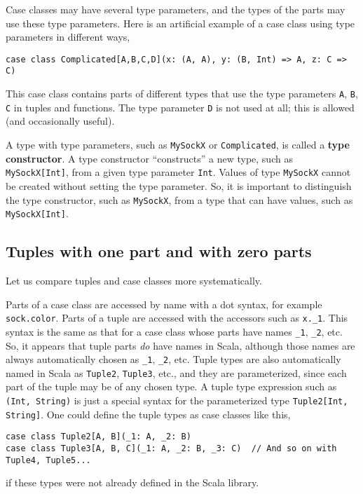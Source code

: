 Case classes may have several type parameters, and the types of the
parts may use these type parameters. Here is an artificial example
of a case class using type parameters in different ways,
\begin{lstlisting}
case class Complicated[A,B,C,D](x: (A, A), y: (B, Int) => A, z: C => C)
\end{lstlisting}
This case class contains parts of different types that use the type
parameters \lstinline!A!, \lstinline!B!, \lstinline!C! in tuples
and functions. The type parameter \lstinline!D! is not used at all;
this is allowed (and occasionally useful).

A type with type parameters, such as \lstinline!MySockX! or \lstinline!Complicated!,
is called a \textbf{type constructor}. A
type constructor ``constructs'' a new type, such as \lstinline!MySockX[Int]!,
from a given type parameter \lstinline!Int!. Values of type \lstinline!MySockX!
cannot be created without setting the type parameter. So, it is important
to distinguish the type constructor, such as \lstinline!MySockX!,
from a type that can have values, such as \lstinline!MySockX[Int]!.

\subsection{Tuples with one part and with zero parts}

Let us compare tuples and case classes more systematically.

Parts of a case class are accessed by name with a dot syntax, for
example \lstinline!sock.color!. Parts of a tuple are accessed with
the accessors such as \lstinline!x._1!. This syntax is the same as
that for a case class whose parts have names \lstinline!_1!, \lstinline!_2!,
etc. So, it appears that tuple parts \emph{do} have names in Scala,
although those names are always automatically chosen as \lstinline!_1!,
\lstinline!_2!, etc. Tuple types are also automatically named in
Scala as \lstinline!Tuple2!, \lstinline!Tuple3!, etc., and they
are parameterized, since each part of the tuple may be of any chosen
type. A tuple type expression such as \lstinline!(Int, String)! is
just a special syntax for the parameterized type \lstinline!Tuple2[Int, String]!.
One could define the tuple types as case classes like this,
\begin{lstlisting}
case class Tuple2[A, B](_1: A, _2: B)
case class Tuple3[A, B, C](_1: A, _2: B, _3: C)  // And so on with Tuple4, Tuple5...
\end{lstlisting}
if these types were not already defined in the Scala library.

